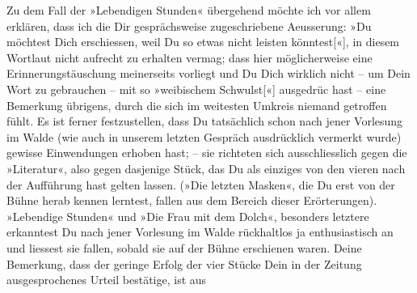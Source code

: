 \pstart
           Zu dem Fall der »Lebendigen Stunden« übergehend
               möchte ich vor allem erklären, dass ich die Dir ge{\pb}sprächsweise zugeschriebene
               Aeusserung: »Du möchtest Dich erschiessen, weil Du so etwas nicht leisten
                  könntest{[}«{]}, in diesem Wortlaut nicht aufrecht zu erhalten
               vermag; dass hier möglicherweise eine Erinnerungstäuschung meinerseits vorliegt und
               Du Dich wirklich nicht – um Dein Wort zu gebrauchen – mit so »weibischem
                  Schwulst{[}«{]} ausgedrüc hast – eine Bemerkung übrigens, durch die sich im weitesten Umkreis niemand
               getroffen fühlt. Es ist ferner festzustellen, dass Du tatsächlich schon nach jener
                  Vorlesung im Walde (wie auch in unserem
               letzten Gespräch ausdrücklich vermerkt wurde) gewisse Einwendungen erhoben hast; –
               sie richteten sich ausschliesslich gegen die »Literatur«, also gegen dasjenige Stück, das Du als einziges von den vieren nach der Aufführung hast gelten
               lassen. (»Die letzten Masken«, die Du erst von
               der Bühne herab kennen lerntest,
               fallen aus dem Bereich dieser Erörterungen). »Lebendige Stunden« und »Die Frau mit dem
                  Dolch«, besonders letztere erkanntest Du nach jener Vorlesung im Walde rückhaltlos ja enthusiastisch an und
               liessest sie fallen, sobald sie auf der Bühne erschienen war\introOben{}en\introOben{}. Deine Bemerkung,
               dass der geringe Erfolg der vier Stücke Dein in der Zeitung ausgespro{\pb}chenes Urteil bestätige, ist aus
